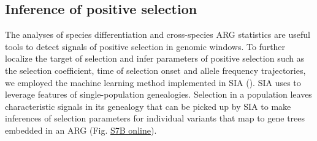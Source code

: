 \subsection{Inference of positive selection}
The analyses of species differentiation and cross-species \ac{ARG} statistics are useful tools to detect signals of positive selection in genomic windows. To further localize the target of selection and infer parameters of positive selection such as the selection coefficient, time of selection onset and allele frequency trajectories, we employed the machine learning method implemented in \ac{SIA} (\cite{hejase_deep-learning_2022}). \ac{SIA} uses  to leverage features of single-population genealogies. Selection in a population leaves characteristic signals in its genealogy that can be picked up by \ac{SIA} to make inferences of selection parameters for individual variants that map to gene trees embedded in an \ac{ARG} (Fig. \href{https://journals.plos.org/PLOSGENETICS/article?id=10.1371/journal.pgen.1010474#sec017}{S7B online}).

